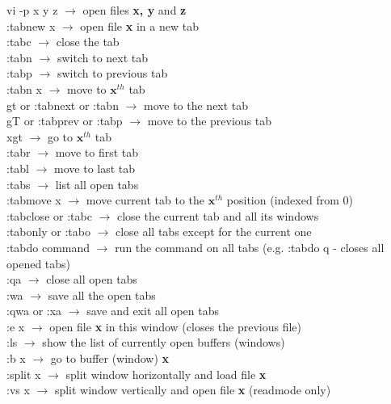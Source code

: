 \documentclass[twoside,a4paper]{article}
\newcommand{\tcb}{\color{blue}}
\newcommand{\tcr}{\color{red}}
\newcommand{\tck}{\color{black}}
\newcommand{\ra }{$\rightarrow$ }
\begin{document}
\begin{multicols}{2}
		\tcr vi \tcb  -p x y z \tck $\rightarrow$
		open files \textbf{x, y} and \textbf{z}\\
		\tcr :tabnew \tcb  x \tck $\rightarrow$
		open file \textbf{x} in a new tab\\
		\tcr :tabc \tck \ra close the tab\\
		\tcr :tabn \tck \ra switch to next tab\\
		\tcr :tabp \tck \ra switch to previous 
		tab\\
		\tcr :tabn \tcb  x \tck \ra move
		to $\textbf{x}^{th}$ tab\\
		\tcr gt or :tabnext or :tabn \tck $\rightarrow$
		move to the next tab\\
		\tcr gT or :tabprev or :tabp \tck $\rightarrow$
		move to the previous tab\\
		\tcr xgt \tck \ra go to 
		$\textbf{x}^{th}$ tab\\
		\tcr :tabr \tck \ra move to first tab\\
		\tcr :tabl \tck \ra move to last tab\\
		\tcr :tabs \tck \ra list all open tabs\\
		\tcr :tabmove \tcb  x \tck $\rightarrow$
		move current tab to the $\textbf{x}^{th}$ position (indexed 
		from 0)\\
		\tcr :tabclose or :tabc \tck \ra close
		the current tab and all its windows\\
		\tcr :tabonly or :tabo \tck \ra close
		all tabs except for the current one\\
		\tcr :tabdo \tcb  command \tck 
		\ra run the command on all tabs (e.g. :tabdo q -
		closes all opened tabs)\\
		\tcr :qa \tck \ra close all open tabs\\
		\tcr :wa \tck \ra save all the open 
		tabs\\
		\tcr :qwa or :xa \tck \ra save and exit
		all open tabs\\
		\tcr :e \tcb  x \tck \ra open 
		file \textbf{x} in this window (closes the previous file)\\
		\tcr :ls \tck \ra show the list of 
		currently open buffers (windows)\\
		\tcr :b \tcb  x \tck \ra go to
		buffer (window) \textbf{x}\\
		\tcr :split \tcb  x \tck \ra 
		split window horizontally and load file \textbf{x}\\
		\tcr :vs \tcb  x \tck \ra 
		split window vertically and open file \textbf{x} (readmode 
		only)\\

\end{multicols}
\end{document}
